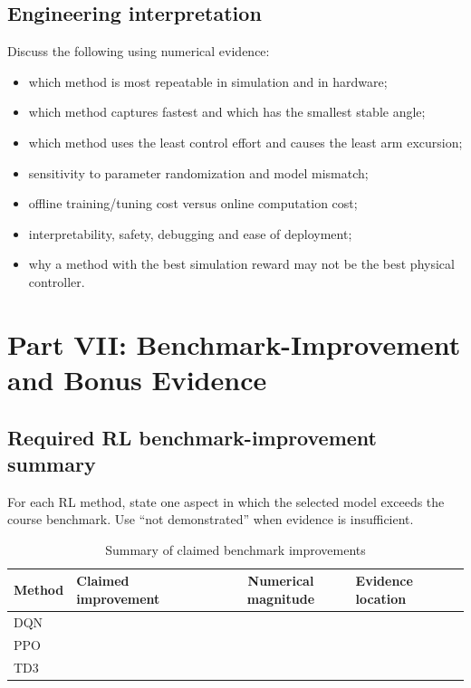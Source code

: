 \documentclass[11pt,a4paper]{article}
\newcommand{\studenttext}[1]{\begin{studentbox}\vspace{#1}\end{studentbox}}
\begin{document}
\subsection{Engineering interpretation}

Discuss the following using numerical evidence:
\begin{itemize}
  \item which method is most repeatable in simulation and in hardware;
  \item which method captures fastest and which has the smallest stable angle;
  \item which method uses the least control effort and causes the least arm excursion;
  \item sensitivity to parameter randomization and model mismatch;
  \item offline training/tuning cost versus online computation cost;
  \item interpretability, safety, debugging and ease of deployment;
  \item why a method with the best simulation reward may not be the best physical controller.
\end{itemize}

\studenttext{20mm}

\section{Part VII: Benchmark-Improvement and Bonus Evidence}
\label{sec:bonus}

\subsection{Required RL benchmark-improvement summary}

For each RL method, state one aspect in which the selected model exceeds the
course benchmark. Use ``not demonstrated'' when evidence is insufficient.

\begin{table}[H]
\centering
\caption{Summary of claimed benchmark improvements}
\label{tab:improvementsummary}
\small
\begin{tabularx}{\linewidth}{l Y C Y}
\toprule
Method & Claimed improvement & Numerical magnitude & Evidence location\\
\midrule
DQN & & & \\
PPO & & & \\
TD3 & & & \\
\bottomrule
\end{tabularx}
\end{table}
\end{document}
